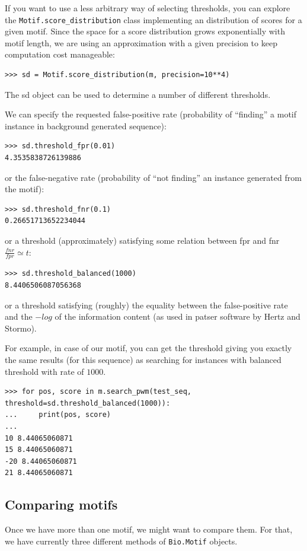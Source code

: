 \documentclass{report}
\begin{document}
If you want to use a less arbitrary way of selecting thresholds, you
can explore the \verb|Motif.score_distribution| class implementing an
distribution of scores for a given motif. Since the space for a score
distribution grows exponentially with motif length, we are using an
approximation with a given precision to keep computation cost manageable:
\begin{verbatim}
>>> sd = Motif.score_distribution(m, precision=10**4)
\end{verbatim}
The sd object can be used to determine a number of different thresholds.

We can specify the requested false-positive rate (probability of ``finding'' a motif instance in background generated sequence):
\begin{verbatim}
>>> sd.threshold_fpr(0.01)
4.3535838726139886
\end{verbatim}

or the false-negative rate (probability of ``not finding'' an instance generated from the motif):
\begin{verbatim}
>>> sd.threshold_fnr(0.1)
0.26651713652234044
\end{verbatim}

or a threshold (approximately) satisfying some relation between fpr
and fnr $\frac{fnr}{fpr}\simeq t$:
\begin{verbatim}
>>> sd.threshold_balanced(1000)
8.4406506087056368
\end{verbatim}

or a threshold satisfying (roughly) the equality between the
false-positive rate and the $-log$ of the information content (as used
in patser software by Hertz and Stormo).

For example, in case of our motif, you can get the threshold giving
you exactly the same results (for this sequence) as searching for
instances with balanced threshold with rate of $1000$.
\begin{verbatim}
>>> for pos, score in m.search_pwm(test_seq, threshold=sd.threshold_balanced(1000)):
...     print(pos, score)
... 
10 8.44065060871
15 8.44065060871
-20 8.44065060871
21 8.44065060871
\end{verbatim}

\subsection{Comparing motifs}
Once we have more than one motif, we might want to compare them. For
that, we have currently three different methods of \verb|Bio.Motif|
objects.
\end{document}
